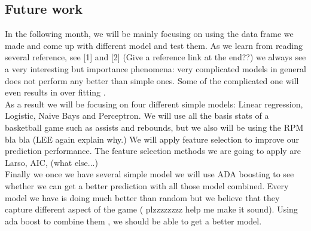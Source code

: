 \documentclass[11pt]{article}
\begin{document}
\subsection{Future work}
In the following month, we will be mainly focusing on using the data frame we made and come up with different model and test them. 
As we learn from reading several reference, see [1] and [2] (Give a reference link at the end??) we always see a very interesting but importance phenomena:
very complicated models in general does not perform any better than simple ones. Some of the complicated one will even results in over fitting . \\
As a result we will be focusing on four different simple models: Linear regression, Logistic, Naive Bays and Perceptron.  We will use all the basis stats
of a basketball game such as assists and rebounds, but we also will be using the RPM bla bla (LEE again explain why.)
We will apply feature selection to improve our prediction performance. The feature selection methods we are going to apply are 
Larso, AIC,  (what else...)
\\
Finally we once we have several simple model we will use ADA boosting to see whether we can get a better prediction with all those model combined.
Every model we have is doing much better than random but we believe that  they capture different aspect of the game  ( plzzzzzzzz help me make it sound). Using ada boost to combine them , we should be able to 
get a better model. 




\end{document}
